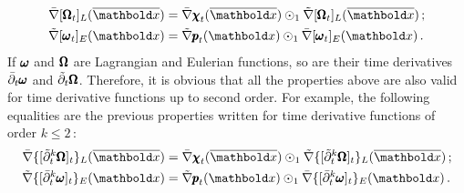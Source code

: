 \begin{equation}\label{eq:gradRelFuncs}
\begin{aligned}
\bar{\nabla}[{\tnr{\Omega}}_{t}]_L(\overline{\vto{x}})&=\bar{\nabla}{\tnr{\chi}}_{t}(\overline{\vto{x}})\odot_1\tilde{\nabla}[{\tnr{\Omega}}_{t}]_L(\overline{\vto{x}})\,;\\
\tilde{\nabla}[{\tnr{\omega}}_{t}]_E({\vto{x}})&=\tilde{\nabla}{\tnr{p}}_{t}({\vto{x}})\odot_1\bar{\nabla}[{\tnr{\omega}}_{t}]_E({\vto{x}})\,.
\end{aligned} 
\end{equation} 
If $\pmb{\omega}$ and $\pmb{\Omega}$ are Lagrangian and Eulerian functions, so are their time derivatives $\bar{\partial}_t\pmb{\omega}$ and $\tilde{\partial}_t\pmb{\Omega}$. Therefore, it is obvious that all the properties above are also valid for time derivative functions up to second order. For example, the following equalities are the previous properties written for time derivative functions of order $k\leqslant 2\,$: 
\begin{equation}\label{eq:gradTimeDerivs}
\begin{aligned}
\bar{\nabla}\{[{\tilde{\partial}_t^k\tnr{\Omega}}]_{t}\}_L(\overline{\vto{x}})&=\bar{\nabla}{\tnr{\chi}}_{t}(\overline{\vto{x}})\odot_1\tilde{\nabla}\{[{\tilde{\partial}_t^k\tnr{\Omega}}]_{t}\}_L(\overline{\vto{x}})\,;\\
\tilde{\nabla}\{[{\bar{\partial}_t^k\tnr{\omega}}]_{t}\}_E({\vto{x}})&=\tilde{\nabla}{\tnr{p}}_{t}({\vto{x}})\odot_1\bar{\nabla}\{[{\bar{\partial}_t^k\tnr{\omega}}]_{t}\}_E({\vto{x}})\,.
\end{aligned} 
\end{equation} 

